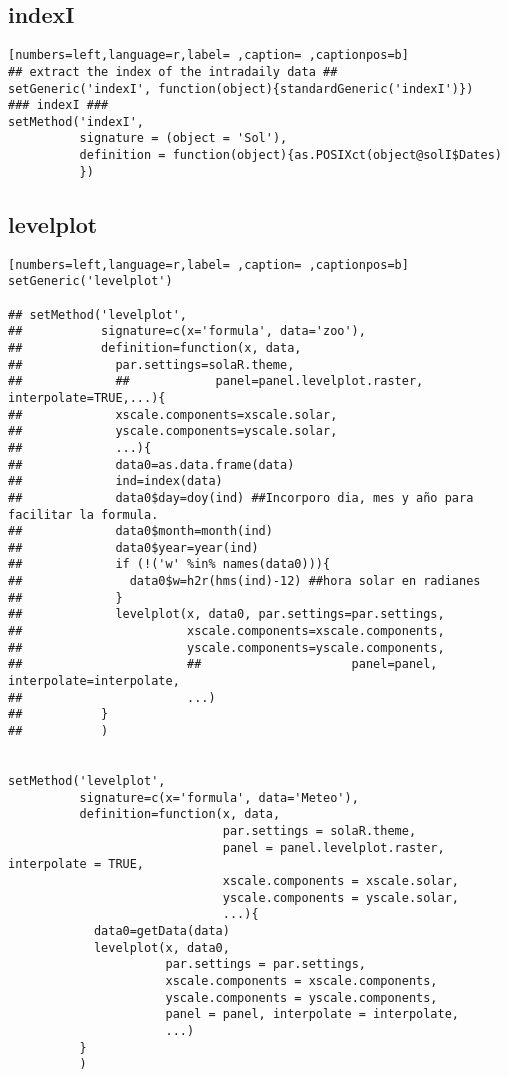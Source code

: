 \subsection{indexI}
\label{sec:orgc4d86d1}
\begin{lstlisting}[numbers=left,language=r,label= ,caption= ,captionpos=b]
## extract the index of the intradaily data ##
setGeneric('indexI', function(object){standardGeneric('indexI')})
### indexI ###
setMethod('indexI',
          signature = (object = 'Sol'),
          definition = function(object){as.POSIXct(object@solI$Dates)
          })
\end{lstlisting}
\subsection{levelplot}
\label{sec:org077c55d}
\begin{lstlisting}[numbers=left,language=r,label= ,caption= ,captionpos=b]
setGeneric('levelplot')

## setMethod('levelplot',
##           signature=c(x='formula', data='zoo'),
##           definition=function(x, data,
##             par.settings=solaR.theme,
##             ##            panel=panel.levelplot.raster, interpolate=TRUE,...){
##             xscale.components=xscale.solar,
##             yscale.components=yscale.solar,
##             ...){
##             data0=as.data.frame(data)
##             ind=index(data)
##             data0$day=doy(ind) ##Incorporo dia, mes y año para facilitar la formula.
##             data0$month=month(ind)
##             data0$year=year(ind)
##             if (!('w' %in% names(data0))){
##               data0$w=h2r(hms(ind)-12) ##hora solar en radianes
##             }
##             levelplot(x, data0, par.settings=par.settings,
##                       xscale.components=xscale.components,
##                       yscale.components=yscale.components,
##                       ##                     panel=panel, interpolate=interpolate,
##                       ...)
##           }
##           )


setMethod('levelplot',
          signature=c(x='formula', data='Meteo'),
          definition=function(x, data,
                              par.settings = solaR.theme,
                              panel = panel.levelplot.raster, interpolate = TRUE,
                              xscale.components = xscale.solar,
                              yscale.components = yscale.solar,
                              ...){
            data0=getData(data)
            levelplot(x, data0,
                      par.settings = par.settings,
                      xscale.components = xscale.components,
                      yscale.components = yscale.components,
                      panel = panel, interpolate = interpolate,
                      ...)
          }
          )


\end{lstlisting}
